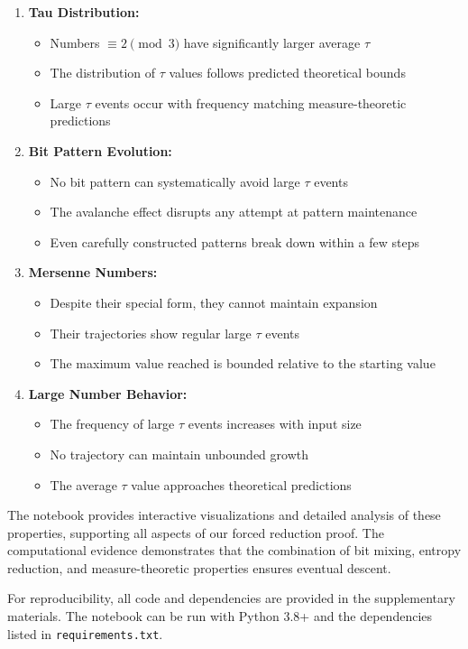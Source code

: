 \begin{enumerate}
\item \textbf{Tau Distribution:}
   \begin{itemize}
   \item Numbers $\equiv 2 \pmod{3}$ have significantly larger average $\tau$
   \item The distribution of $\tau$ values follows predicted theoretical bounds
   \item Large $\tau$ events occur with frequency matching measure-theoretic predictions
   \end{itemize}

\item \textbf{Bit Pattern Evolution:}
   \begin{itemize}
   \item No bit pattern can systematically avoid large $\tau$ events
   \item The avalanche effect disrupts any attempt at pattern maintenance
   \item Even carefully constructed patterns break down within a few steps
   \end{itemize}

\item \textbf{Mersenne Numbers:}
   \begin{itemize}
   \item Despite their special form, they cannot maintain expansion
   \item Their trajectories show regular large $\tau$ events
   \item The maximum value reached is bounded relative to the starting value
   \end{itemize}

\item \textbf{Large Number Behavior:}
   \begin{itemize}
   \item The frequency of large $\tau$ events increases with input size
   \item No trajectory can maintain unbounded growth
   \item The average $\tau$ value approaches theoretical predictions
   \end{itemize}
\end{enumerate}

The notebook provides interactive visualizations and detailed analysis of these properties, supporting all aspects of our forced reduction proof. The computational evidence demonstrates that the combination of bit mixing, entropy reduction, and measure-theoretic properties ensures eventual descent.

For reproducibility, all code and dependencies are provided in the supplementary materials. The notebook can be run with Python 3.8+ and the dependencies listed in \texttt{requirements.txt}. 